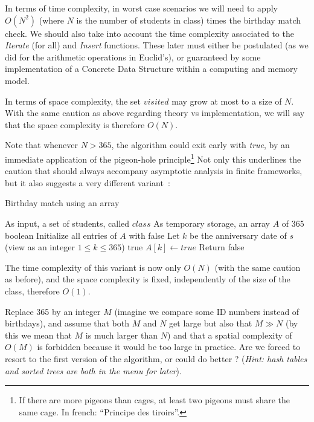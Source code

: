 \documentclass[12pt]{article}
\theoremstyle{plain}
\theoremstyle{remark}
\begin{document}
In terms of time complexity, in worst case scenarios we will need to apply
$O(N^2)$ (where $N$ is the number of students in class) times the birthday match
check. We should also take into account the time complexity associated to the
{\it Iterate} (for all) and {\it Insert} functions. These later must either be
postulated (as we did for the arithmetic operations in Euclid's), or guaranteed 
by some implementation of a Concrete Data Structure within a computing and
memory model.

\medskip

In terms of space complexity, the set $visited$ may grow at most to a size of
$N$. With the same caution as above regarding theory vs implementation, we will say that 
the space complexity is therefore $O(N)$.


Note that whenever $N > 365$, the algorithm could exit early with {\it true}, by
an immediate application of the pigeon-hole principle\footnote{If there are more pigeons than
cages, at least two pigeons must share the same cage. In french: ``Principe des
tiroirs''.} Not only this underlines
the caution that should always accompany asymptotic analysis in finite
frameworks, but it also suggests a very different variant~: 

\begin{algorithm}[H]
\caption{Birthday match using an array}
\begin{algorithmic}
\Require As input, a set of students, called $class$
\Require As temporary storage, an array $A$ of 365 boolean
\State Initialize all entries of $A$ with false
\State Let $k$ be the anniversary date of $s$ (view as an integer $1 \leq k \leq 365$)
\State \Return true
\Else
\State $A[k] \gets true$
\EndIf
\EndFor
\State Return false
\end{algorithmic}
\end{algorithm}

The time complexity of this variant is now only $O(N)$ (with the same caution as
before), and the space complexity is fixed, independently of the size of the
class, therefore $O(1)$.

\medskip

 Replace 365 by an integer $M$ (imagine we compare
some ID numbers instead of birthdays), and assume that both $M$ and $N$ get
large but also that $M \gg N$ (by this we mean that $M$ is much larger than $N$)
and that a spatial complexity of $O(M)$ is forbidden because it would be too
large in practice. Are we forced to resort to the first version of the
algorithm, or could do better ? ({\it Hint: hash tables and sorted trees are both in the
menu for later}).
\end{document}
